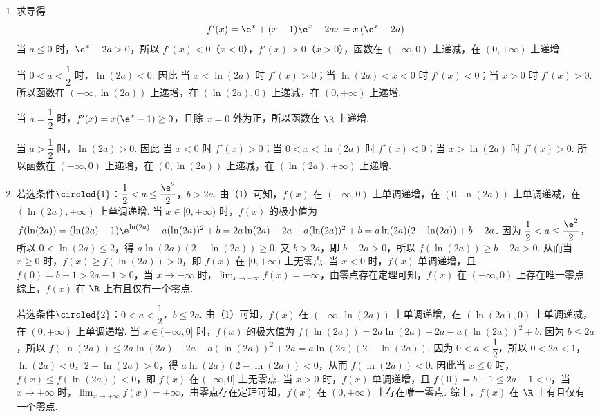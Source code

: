 \begin{solution}
\begin{enumerate}
\item 求导得
\[
f'(x)=\e^x+(x-1)\e^x-2ax=x\left(\e^x-2a\right)
\]
当 \(a\le0\) 时，\(\e^x-2a>0\)，所以 \(f'(x)<0\)（\(x<0\)），\(f'(x)>0\)（\(x>0\)），函数在 \((-\infty,0)\) 上递减，在 \((0,+\infty)\) 上递增.

当 \(0<a<\dfrac12\) 时，\(\ln(2a)<0\). 因此
当 \(x<\ln(2a)\) 时 \(f'(x)>0\)；当 \(\ln(2a)<x<0\) 时 \(f'(x)<0\)；当 \(x>0\) 时 \(f'(x)>0\).
所以函数在 \((-\infty,\ln(2a))\) 上递增，在 \((\ln(2a),0)\) 上递减，在 \((0,+\infty)\) 上递增.

当 \(a=\dfrac12\) 时，\(f'(x)=x(\e^x-1)\ge0\)，且除 \(x=0\) 外为正，所以函数在 \(\R\) 上递增.

当 \(a>\dfrac12\) 时，\(\ln(2a)>0\). 因此
当 \(x<0\) 时 \(f'(x)>0\)；当 \(0<x<\ln(2a)\) 时 \(f'(x)<0\)；当 \(x>\ln(2a)\) 时 \(f'(x)>0\).
所以函数在 \((-\infty,0)\) 上递增，在 \((0,\ln(2a))\) 上递减，在 \((\ln(2a),+\infty)\) 上递增.

\item 若选条件\(\circled{1}\)：\(\dfrac12<a\le\dfrac{\e^2}{2}\)，\(b>2a\). 由（1）可知，\(f(x)\) 在 \((-\infty,0)\) 上单调递增，在 \((0,\ln(2a))\) 上单调递减，在 \((\ln(2a),+\infty)\) 上单调递增. 当 \(x\in[0,+\infty)\) 时，\(f(x)\) 的极小值为 \(f(\ln(2a))=(\ln(2a)-1)\e^{\ln(2a)}-a(\ln(2a))^2+b=2a\ln(2a)-2a-a(\ln(2a))^2+b=a\ln(2a)(2-\ln(2a))+b-2a\). 因为 \(\dfrac12<a\le\dfrac{\e^2}{2}\)，所以 \(0<\ln(2a)\le2\)，得 \(a\ln(2a)(2-\ln(2a))\ge0\). 又 \(b>2a\)，即 \(b-2a>0\)，所以 \(f(\ln(2a))\ge b-2a>0\). 从而当 \(x\ge0\) 时，\(f(x)\ge f(\ln(2a))>0\)，即 \(f(x)\) 在 \([0,+\infty)\) 上无零点. 当 \(x<0\) 时，\(f(x)\) 单调递增，且 \(f(0)=b-1>2a-1>0\)，当 \(x\to-\infty\) 时，\(\lim_{x\to-\infty}f(x)=-\infty\)，由零点存在定理可知，\(f(x)\) 在 \((-\infty,0)\) 上存在唯一零点. 综上，\(f(x)\) 在 \(\R\) 上有且仅有一个零点.

若选条件\(\circled{2}\)：\(0<a<\dfrac12\)，\(b\le2a\). 由（1）可知，\(f(x)\) 在 \((-\infty,\ln(2a))\) 上单调递增，在 \((\ln(2a),0)\) 上单调递减，在 \((0,+\infty)\) 上单调递增. 当 \(x\in(-\infty,0]\) 时，\(f(x)\) 的极大值为 \(f(\ln(2a))=2a\ln(2a)-2a-a(\ln(2a))^2+b\). 因为 \(b\le2a\)，所以 \(f(\ln(2a))\le2a\ln(2a)-2a-a(\ln(2a))^2+2a=a\ln(2a)(2-\ln(2a))\). 因为 \(0<a<\dfrac12\)，所以 \(0<2a<1\)，\(\ln(2a)<0\)，\(2-\ln(2a)>0\)，得 \(a\ln(2a)(2-\ln(2a))<0\)，从而 \(f(\ln(2a))<0\). 因此当 \(x\le0\) 时，\(f(x)\le f(\ln(2a))<0\)，即 \(f(x)\) 在 \((-\infty,0]\) 上无零点. 当 \(x>0\) 时，\(f(x)\) 单调递增，且 \(f(0)=b-1\le2a-1<0\)，当 \(x\to+\infty\) 时，\(\lim_{x\to+\infty}f(x)=+\infty\)，由零点存在定理可知，\(f(x)\) 在 \((0,+\infty)\) 上存在唯一零点. 综上，\(f(x)\) 在 \(\R\) 上有且仅有一个零点.
\end{enumerate}
\end{solution}
